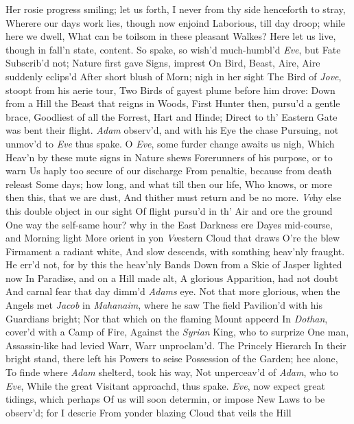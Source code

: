 \documentclass[11pt]{book}
\newcounter {first}
\begin{document}
Her rosie progress smiling; let us forth, 
I never from thy side henceforth to stray, 
Wherere our days work lies, though now enjoind 
Laborious, till day droop; while here we dwell, 
What can be toilsom in these pleasant Walkes? 
Here let us live, though in fall'n state, content. 
\quad So spake, so wish'd much-humbl'd \textit{Eve}, but Fate 
Subscrib'd not; Nature first gave Signs, imprest 
On Bird, Beast, Aire, Aire suddenly eclips'd 
After short blush of Morn; nigh in her sight 
The Bird of \textit{Jove}, stoopt from his aerie tour, 
Two Birds of gayest plume before him drove: 
Down from a Hill the Beast that reigns in Woods, 
First Hunter then, pursu'd a gentle brace, 
Goodliest of all the Forrest, Hart and Hinde; 
Direct to th' Eastern Gate was bent their flight. 
\textit{Adam} observ'd, and with his Eye the chase 
Pursuing, not unmov'd to \textit{Eve} thus spake. 
\quad O \textit{Eve}, some furder change awaits us nigh, 
Which Heav'n by these mute signs in Nature shews 
Forerunners of his purpose, or to warn 
Us haply too secure of our discharge 
From penaltie, because from death releast 
Some days; how long, and what till then our life, 
Who knows, or more then this, that we are dust, 
And thither must return and be no more. 
\textit{Vv}hy else this double object in our sight 
Of flight pursu'd in th' Air and ore the ground 
One way the self-same hour? why in the East 
Darkness ere Dayes mid-course, and Morning light 
More orient in yon \textit{Vv}estern Cloud that draws 
O're the blew Firmament a radiant white, 
And slow descends, with somthing heav'nly fraught. 
\quad He err'd not, for by this the heav'nly Bands 
Down from a Skie of Jasper lighted now 
In Paradise, and on a Hill made alt, 
A glorious Apparition, had not doubt 
And carnal fear that day dimm'd \textit{Adams} eye. 
Not that more glorious, when the Angels met 
\textit{Jacob} in \textit{Mahanaim}, where he saw 
The field Pavilion'd with his Guardians bright; 
Nor that which on the flaming Mount appeerd 
In \textit{Dothan}, cover'd with a Camp of Fire, 
Against the \textit{Syrian} King, who to surprize 
One man, Assassin-like had levied Warr, 
Warr unproclam'd.  The Princely Hierarch 
In their bright stand, there left his Powers to seise 
Possession of the Garden; hee alone, 
To finde where \textit{Adam} shelterd, took his way, 
Not unperceav'd of \textit{Adam}, who to \textit{Eve}, 
While the great Visitant approachd, thus spake. 
\quad \textit{Eve}, now expect great tidings, which perhaps 
Of us will soon determin, or impose 
New Laws to be observ'd; for I descrie 
From yonder blazing Cloud that veils the Hill 
\end{document}
